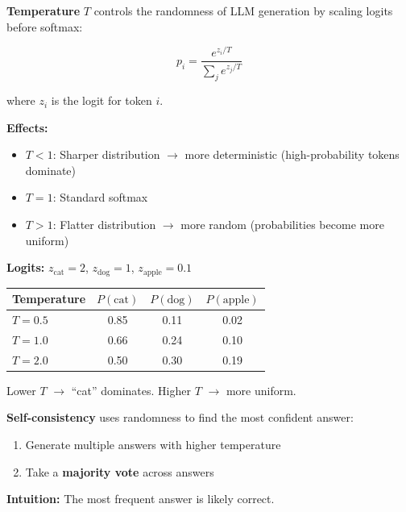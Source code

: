 \begin{defbox}[Temperature]
\textbf{Temperature} $T$ controls the randomness of LLM generation by scaling logits before softmax:

\[
p_i = \frac{e^{z_i / T}}{\sum_j e^{z_j / T}}
\]

where $z_i$ is the logit for token $i$.

\textbf{Effects:}
\begin{itemize}
  \item $T < 1$: Sharper distribution $\to$ more deterministic (high-probability tokens dominate)
  \item $T = 1$: Standard softmax
  \item $T > 1$: Flatter distribution $\to$ more random (probabilities become more uniform)
\end{itemize}
\end{defbox}

\begin{exbox}
\textbf{Logits:} $z_{\text{cat}} = 2$, $z_{\text{dog}} = 1$, $z_{\text{apple}} = 0.1$

\begin{center}
\renewcommand{\arraystretch}{1.2}
\begin{tabular}{@{} l c c c @{}}
\toprule
\textbf{Temperature} & $P(\text{cat})$ & $P(\text{dog})$ & $P(\text{apple})$ \\
\midrule
$T = 0.5$ & 0.85 & 0.11 & 0.02 \\
$T = 1.0$ & 0.66 & 0.24 & 0.10 \\
$T = 2.0$ & 0.50 & 0.30 & 0.19 \\
\bottomrule
\end{tabular}
\end{center}

Lower $T$ $\to$ ``cat'' dominates. Higher $T$ $\to$ more uniform.
\end{exbox}

\begin{defbox}
\textbf{Self-consistency} uses randomness to find the most confident answer:
\begin{enumerate}
  \item Generate multiple answers with higher temperature
  \item Take a \textbf{majority vote} across answers
\end{enumerate}

\textbf{Intuition:} The most frequent answer is likely correct.
\end{defbox}


